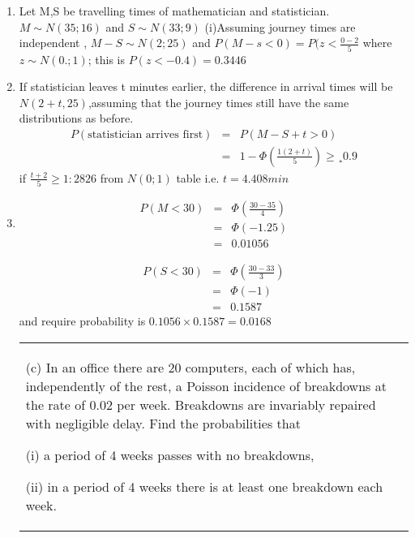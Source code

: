 \documentclass[a4paper,12pt]{article}
\begin{document}
\begin{enumerate}
\begin{table}[ht!]
\begin{tabular}{|p{15cm}|}
 \\ \hline
      \end{tabular}
    \end{table}
\item Let M,S be travelling times of mathematician and statistician.
$M \sim N(35; 16)$ and $S \sim N(33; 9)$
(i)Assuming journey times are independent ,
$M - S \sim N(2; 25)$ and $P(M - s < 0) = P(z <
\frac{0 - 2}{5}$
where $z \sim N(0.; 1)$; this is $P(z < -0.4) = 0.3446$
\item If statistician leaves t minutes earlier, the difference in arrival times will be $N(2+t,25)$,assuming
that the journey times still have the same distributions as before.
\begin{eqnarray*}
P(\mbox{statistician arrives first}) &=& P(M - S + t > 0)\\
&=& 1 - \Phi \left(\frac{1(2+t)}{5} \right) \geq¸ 0.9 
\end{eqnarray*}
if
$ \frac{t + 2}{5} \geq 1:2826$ from $N(0; 1)$ table i.e. $t = 4.408 min$
\item
\begin{eqnarray*}
P(M < 30) &=& \Phi \left( \frac{30-35}{4} \right) 
 \\ &=& \Phi(-1.25)\\ &=& 0.01056
\end{eqnarray*}

\begin{eqnarray*}
P(S < 30)  &=&  \Phi \left( \frac{30-33}{3} \right) \\ &=&  \Phi(-1) \\ &=&  0.1587
\end{eqnarray*}
and require probability is $0.1056 \times 0.1587 = 0.0168$

\newpage
  \begin{table}[ht!]
     \centering
     \begin{tabular}{|p{15cm}|}
     \hline  
(c) In an office there are 20 computers, each of which has, independently of the rest, a Poisson incidence of breakdowns at the rate of 0.02 per week.  Breakdowns are invariably repaired with negligible delay.  Find the probabilities that 
 
(i) a period of 4 weeks passes with no breakdowns, 

 
(ii) in a period of 4 weeks there is at least one breakdown each week. 
 

\end{tabular}
\end{table}
\end{enumerate}
\end{document}
